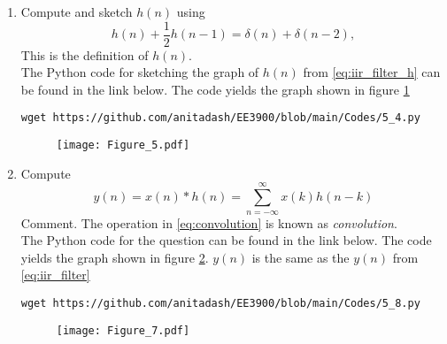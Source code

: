 \documentclass[journal,12pt,twocolumn]{IEEEtran}
\renewcommand\thesection{\arabic{section}}
\begin{document}
\begin{enumerate}[label=\thesection.\arabic*]
\item 
Compute and sketch $h(n)$ using 
\begin{equation}
\label{eq:iir_filter_h}
h(n) + \frac{1}{2}h(n-1) = \delta(n) + \delta(n-2), 
\end{equation}
%
This is the definition of $h(n)$.
\\
\solution The Python code for sketching the graph of $h(n)$ from \eqref{eq:iir_filter_h} can be found in the link below. The code yields the graph shown in figure \ref{fig:5}
\begin{lstlisting}
wget https://github.com/anitadash/EE3900/blob/main/Codes/5_4.py
\end{lstlisting}
\begin{figure}[!ht]
\begin{center}
\texttt{[image: Figure\_5.pdf]}
\end{center}
\label{fig:5}	
\end{figure}  
\item Compute 
%
\begin{equation}
\label{eq:convolution}
y(n) = x(n)*h(n) = \sum_{n=-\infty}^{\infty}x(k)h(n-k)
\end{equation}
%
Comment. The operation in \eqref{eq:convolution} is known as
{\em convolution}.
%
\\
\solution The Python code for the question can be found in the link below. The code yields the graph shown in figure \ref{fig:7}. $y(n)$ is the same as the $y(n)$ from \eqref{eq:iir_filter}
\begin{lstlisting}
wget https://github.com/anitadash/EE3900/blob/main/Codes/5_8.py
\end{lstlisting}
\begin{figure}[!ht]
\begin{center}
\texttt{[image: Figure\_7.pdf]}
\end{center}
\label{fig:7}	
\end{figure}  
    


\end{enumerate}
\end{document}
